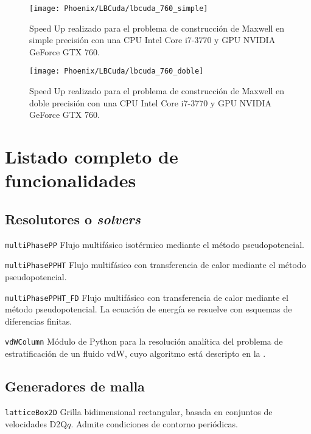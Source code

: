 \begin{figure}[ht]
	\centering
	\texttt{[image: Phoenix/LBCuda/lbcuda\_760\_simple]}
	\caption{Speed Up realizado para el problema de construcci\'on de Maxwell en simple precisi\'on con una CPU Intel Core i7-3770 y GPU NVIDIA GeForce GTX 760.}
	\label{fig:lbcuda_760_simple}
\end{figure}

\begin{figure}[ht]
	\centering
	\texttt{[image: Phoenix/LBCuda/lbcuda\_760\_doble]}
	\caption{Speed Up realizado para el problema de construcci\'on de Maxwell en doble precisi\'on con una CPU Intel Core i7-3770 y GPU NVIDIA GeForce GTX 760.}
	\label{fig:lbcuda_760_doble}
\end{figure}




\section{Listado completo de funcionalidades}

\subsection{Resolutores o \emph{solvers}}

\texttt{multiPhasePP}\: Flujo multif\'asico isot\'ermico mediante el m\'etodo pseudopotencial.
\medskip

\texttt{multiPhasePPHT}\: Flujo multif\'asico con transferencia de calor mediante el m\'etodo pseudopotencial.
\medskip

\texttt{multiPhasePPHT\_FD}\: Flujo multif\'asico con transferencia de calor mediante el m\'etodo pseudopotencial. La ecuaci\'on de energ\'ia se resuelve con esquemas de diferencias finitas.
\medskip

\texttt{vdWColumn}\: M\'odulo de Python para la resoluci\'on anal\'itica del problema de estratificaci\'on de un fluido vdW, cuyo algoritmo est\'a descripto en la .
\medskip



\subsection{Generadores de malla}

\texttt{latticeBox2D}\: Grilla bidimensional rectangular, basada en conjuntos de velocidades D2Q$q$. Admite condiciones de contorno peri\'odicas.
\medskip

